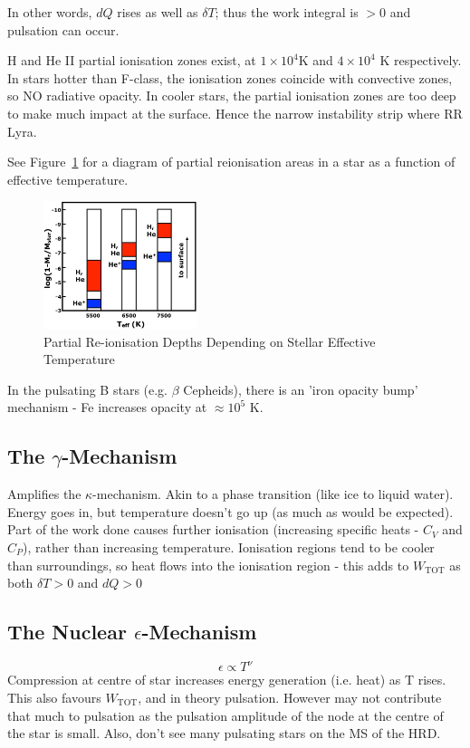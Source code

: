 \documentclass{spy}
\begin{document}
In other words, \(dQ\) rises as well as \(\delta T\); thus the work integral is \(>0\) and pulsation can occur.

H and He II partial ionisation zones exist, at \(1 \times 10^4\)K and \(4 \times 10^4\) K respectively. In stars hotter than F-class, the ionisation zones coincide with convective zones, so NO radiative opacity. In cooler stars, the partial ionisation zones are too deep to make much impact at the surface. Hence the narrow instability strip where RR Lyra.

See Figure~\ref{ionisation_temp_diagram} for a diagram of partial reionisation areas in a star as a function of effective temperature. 

\begin{figure}[h]
    \centering
    \includegraphics[width=0.4\textwidth]{ionisation_temp.eps}
    \caption{Partial Re-ionisation Depths Depending on Stellar Effective Temperature} 
    \label{ionisation_temp_diagram}
\end{figure}

In the pulsating B stars (e.g. \(\beta\) Cepheids), there is an 'iron opacity bump' mechanism - Fe increases opacity at \(\approx 10^5\) K. 

\subsection{The \(\gamma\)-Mechanism}
Amplifies the \(\kappa\)-mechanism. Akin to a phase transition (like ice to liquid water). Energy goes in, but temperature doesn't go up (as much as would be expected). Part of the work done causes further ionisation (increasing specific heats - \(C_V\) and \(C_P\)), rather than increasing temperature. Ionisation regions tend to be cooler than surroundings, so heat flows into the ionisation region - this adds to \(W_\mathrm{TOT}\) as both \(\delta T > 0\) and \(dQ > 0\)

\subsection{The Nuclear \(\epsilon\)-Mechanism}
\begin{equation}
\epsilon \propto T^\nu
\end{equation}
Compression at centre of star increases energy generation (i.e. heat) as T rises. This also favours \(W_\mathrm{TOT}\), and in theory pulsation. However may not contribute that much to pulsation as the pulsation amplitude of the node at the centre of the star is small. Also, don't see many pulsating stars on the MS of the HRD.
\end{document}
